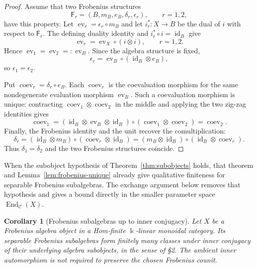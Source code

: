 \documentclass[11pt]{amsart}
\newtheorem{corollary}[theorem]{Corollary}
\theoremstyle{definition}
\theoremstyle{remark}
\newcommand{\C}{\mathcal C}
\newcommand{\kk}{\Bbbk}
\DeclareMathOperator{\End}{End}
\DeclareMathOperator{\id}{id}
\DeclareMathOperator{\ev}{ev}
\DeclareMathOperator{\coev}{coev}
\begin{document}
\begin{proof}
Assume that two Frobenius structures
\[
 \mathsf F_r=(B,m_B,e_B,\delta_r,\epsilon_r),\qquad r=1,2,
\]
have this property.  Let $\ev_r=\epsilon_r\circ m_B$ and let
$i_r^*:X\to B$
be the dual of $i$ with respect to $\mathsf F_r$.  The defining duality
identity and $i_r^*\circ i=\id_B$ give
\begin{equation}\label{eq:restricted-frobenius-pairing}
  \ev_r=\ev_X\circ(i\otimes i),\qquad r=1,2.
\end{equation}
Hence $\ev_1=\ev_2=: \ev_B$.  Since the algebra structure is fixed,
\[
  \epsilon_r=\ev_B\circ(\id_B\otimes e_B),
\]
so $\epsilon_1=\epsilon_2$.

Put $\coev_r=\delta_r\circ e_B$.  Each $\coev_r$ is the
coevaluation morphism for the same nondegenerate evaluation morphism
$\ev_B$.  Such a coevaluation morphism is unique: contracting
$\coev_1\otimes\coev_2$ in the middle and applying the two zig-zag
identities gives
\begin{equation}\label{eq:coevaluation-unique}
  \coev_1=(\id_B\otimes\ev_B\otimes\id_B)\circ
  (\coev_1\otimes\coev_2)=\coev_2.
\end{equation}
Finally, the Frobenius identity and the unit recover the comultiplication:
\begin{equation}\label{eq:comultiplication-from-coevaluation}
  \delta_r=(\id_B\otimes m_B)\circ(\coev_r\otimes\id_B)
  =(m_B\otimes\id_B)\circ(\id_B\otimes\coev_r).
\end{equation}
Thus $\delta_1=\delta_2$ and the two Frobenius structures coincide.
\end{proof}

When the subobject hypothesis of Theorem~\ref{thm:subobjects} holds,
that theorem and Lemma~\ref{lem:frobenius-unique} already give qualitative
finiteness for separable Frobenius subalgebras.  The exchange argument
below removes that hypothesis and gives a bound directly in the smaller
parameter space $\End_{\C}(X)$.

\begin{corollary}[Frobenius subalgebras up to inner conjugacy]
\label{cor:frobenius-inner}
Let $X$ be a Frobenius algebra object in a Hom-finite $\kk$-linear
monoidal category.  Its separable Frobenius subalgebras form finitely
many classes under inner conjugacy of their underlying algebra
subobjects, in the sense of \S2.
The ambient inner automorphism is not required to preserve the chosen
Frobenius counit.
\end{corollary}
\end{document}
